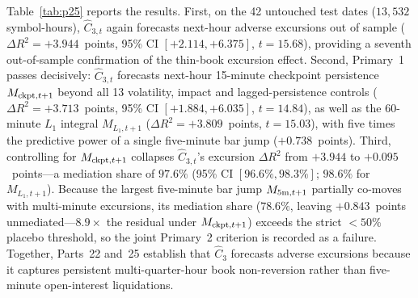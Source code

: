Table~\ref{tab:p25} reports the results. First, on the 42 untouched test dates ($13{,}532$ symbol-hours), $\hat C_{3,t}$ again forecasts next-hour adverse excursions out of sample ($\Delta R^2=+3.944$~points, 95\% CI $[+2.114,+6.375]$, $t=15.68$), providing a seventh out-of-sample confirmation of the thin-book excursion effect. Second, Primary~1 passes decisively: $\hat C_{3,t}$ forecasts next-hour 15-minute checkpoint persistence $M_{{\rm ckpt},t+1}$ beyond all 13 volatility, impact and lagged-persistence controls ($\Delta R^2=+3.713$~points, 95\% CI $[+1.884,+6.035]$, $t=14.84$), as well as the 60-minute $L_1$ integral $M_{L_1,t+1}$ ($\Delta R^2=+3.809$~points, $t=15.03$), with five times the predictive power of a single five-minute bar jump ($+0.738$~points). Third, controlling for $M_{{\rm ckpt},t+1}$ collapses $\hat C_{3,t}$'s excursion $\Delta R^2$ from $+3.944$ to $+0.095$~points---a mediation share of $97.6\%$ (95\% CI $[96.6\%,98.3\%]$; $98.6\%$ for $M_{L_1,t+1}$). Because the largest five-minute bar jump $M_{5{\rm m},t+1}$ partially co-moves with multi-minute excursions, its mediation share ($78.6\%$, leaving $+0.843$~points unmediated---$8.9\times$ the residual under $M_{{\rm ckpt},t+1}$) exceeds the strict $<50\%$ placebo threshold, so the joint Primary~2 criterion is recorded as a failure. Together, Parts~22 and~25 establish that $\hat C_3$ forecasts adverse excursions because it captures persistent multi-quarter-hour book non-reversion rather than five-minute open-interest liquidations.
